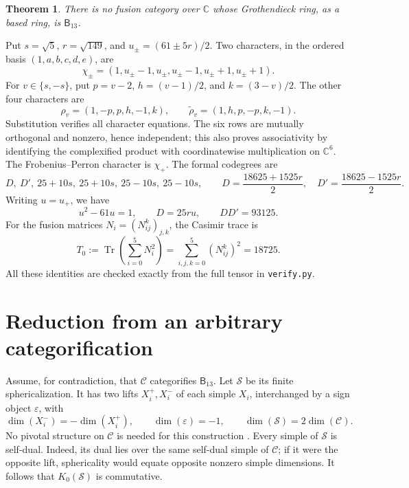 \documentclass[11pt]{article}
\newtheorem{theorem}{Theorem}
\newcommand{\C}{\mathbb C}
\newcommand{\Tr}{\operatorname{Tr}}
\newcommand{\B}{\mathsf B_{13}}
\numberwithin{equation}{section}
\begin{document}
\begin{theorem}\label{thm:main}
There is no fusion category over $\C$ whose Grothendieck ring, as a based ring,
is $\B$.
\end{theorem}

Put $s=\sqrt5$, $r=\sqrt{149}$, and $u_\pm=(61\pm5r)/2$. Two characters, in the
ordered basis $(1,a,b,c,d,e)$, are
\[
\chi_\pm=(1,u_\pm-1,u_\pm,u_\pm-1,u_\pm+1,u_\pm+1).
\]
For $v\in\{s,-s\}$, put $p=v-2$, $h=(v-1)/2$, and $k=(3-v)/2$. The other four
characters are
\[
\rho_v=(1,-p,p,h,-1,k),\qquad
\widetilde\rho_v=(1,h,p,-p,k,-1).
\]
Substitution verifies all character equations. The six rows are mutually
orthogonal and nonzero, hence independent; this also proves associativity by
identifying the complexified product with coordinatewise multiplication on
$\C^6$.
The Frobenius--Perron character is $\chi_+$. The formal codegrees are
\begin{equation}\label{eq:original-codegrees}
D,\ D',\ 25+10s,\ 25+10s,\ 25-10s,\ 25-10s,
\qquad D=\frac{18625+1525r}{2},\quad D'=\frac{18625-1525r}{2}.
\end{equation}
Writing $u=u_+$, we have
\begin{equation}\label{eq:unit}
u^2-61u=1,\qquad D=25ru,\qquad DD'=93125.
\end{equation}
For the fusion matrices $N_i=(N_{ij}^k)_{j,k}$, the Casimir trace is
\begin{equation}\label{eq:ordinary-trace}
T_0:=\Tr\left(\sum_{i=0}^5N_i^2\right)
=\sum_{i,j,k=0}^5(N_{ij}^k)^2=18725.
\end{equation}
All these identities are checked exactly from the full tensor in
\texttt{verify.py}.

\section{Reduction from an arbitrary categorification}
Assume, for contradiction, that $\mathcal C$ categorifies $\B$. Let
$\mathcal S$ be its finite sphericalization. It has two lifts $X_i^+,X_i^-$ of
each simple $X_i$, interchanged by a sign object $\varepsilon$, with
\[
\dim(X_i^-)=-\dim(X_i^+),\qquad \dim(\varepsilon)=-1,
\qquad \dim(\mathcal S)=2\dim(\mathcal C).
\]
No pivotal structure on $\mathcal C$ is needed for this construction
\cite[Corollary 7.6]{ENO4}.
Every simple of $\mathcal S$ is self-dual. Indeed, its dual lies over the same
self-dual simple of $\mathcal C$; if it were the opposite lift, sphericality
would equate opposite nonzero simple dimensions. It follows that
$K_0(\mathcal S)$ is commutative.
\end{document}
